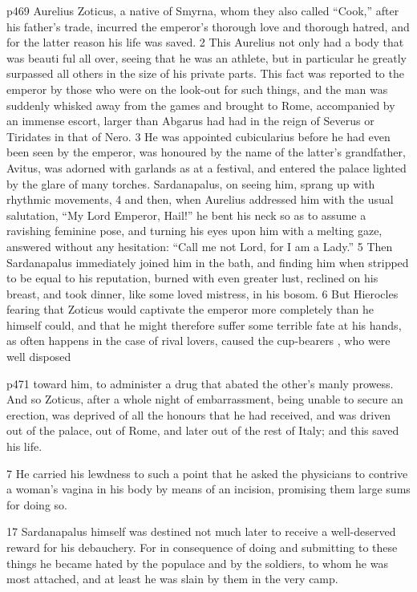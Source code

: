 p469
Aurelius Zoticus, a native of Smyrna, whom they also called ``Cook,'' after his father's trade, incurred the emperor's thorough love and thorough hatred, and for the latter reason his life was saved. 2 This Aurelius not only had a body that was beauti ­ful all over, seeing that he was an athlete, but in particular he greatly surpassed all others in the size of his private parts. This fact was reported to the emperor by those who were on the look-out for such things, and the man was suddenly whisked away from the games and brought to Rome, accompanied by an immense escort, larger than Abgarus had had in the reign of Severus or Tiridates in that of Nero. 3 He was appointed cubicularius before he had even been seen by the emperor, was honoured by the name of the latter's grandfather, Avitus, was adorned with garlands as at a festival, and entered the palace lighted by the glare of many torches. Sardanapalus, on seeing him, sprang up with rhythmic movements, 4 and then, when Aurelius addressed him with the usual salutation, ``My Lord Emperor, Hail!'' he bent his neck so as to assume a ravishing feminine pose, and turning his eyes upon him with a melting gaze, answered without any hesitation: ``Call me not Lord, for I am a Lady.'' 5 Then Sardanapalus immediately joined him in the bath, and finding him when stripped to be equal to his reputation, burned with even greater lust, reclined on his breast, and took dinner, like some loved mistress, in his bosom. 6 But Hierocles fearing that Zoticus would captivate the emperor more completely than he himself could, and that he might therefore suffer some terrible fate at his hands, as often happens in the case of rival lovers, caused the cup-bearers , who were well disposed

p471 toward him, to administer a drug that abated the other's manly prowess. And so Zoticus, after a whole night of embarrassment, being unable to secure an erection, was deprived of all the honours that he had received, and was driven out of the palace, out of Rome, and later out of the rest of Italy; and this saved his life.

7
He carried his lewdness to such a point that he asked the physicians to contrive a woman's vagina in his body by means of an incision, promising them large sums for doing so.

17
Sardanapalus himself was destined not much later to receive a well-deserved reward for his debauchery. For in consequence of doing and submitting to these things he became hated by the populace and by the soldiers, to whom he was most attached, and at least he was slain by them in the very camp.


